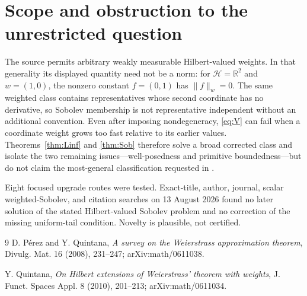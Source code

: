\documentclass[11pt]{article}
\newcommand{\Hh}{\mathcal H}
\begin{document}
\section{Scope and obstruction to the unrestricted question}

The source permits arbitrary weakly measurable Hilbert-valued weights.  In
that generality its displayed quantity need not be a norm: for
$\Hh=\mathbb R^2$ and $w=(1,0)$, the nonzero constant $f=(0,1)$ has
$\|f\|_w=0$.  The same weighted class contains representatives whose second
coordinate has no derivative, so Sobolev membership is not representative
independent without an additional convention.  Even after imposing
nondegeneracy, \eqref{eq:V} can fail when a coordinate weight grows too fast
relative to its earlier values.  Theorems~\ref{thm:Linf} and
\ref{thm:Sob} therefore solve a broad corrected class and isolate the two
remaining issues---well-posedness and primitive boundedness---but do not
claim the most-general classification requested in \cite{PQ}.

Eight focused upgrade routes were tested.  Exact-title, author, journal,
scalar weighted-Sobolev, and citation searches on 13 August 2026 found no
later solution of the stated Hilbert-valued Sobolev problem and no correction
of the missing uniform-tail condition.  Novelty is plausible, not certified.

\begin{thebibliography}{9}
D. Pérez and Y. Quintana,
\emph{A survey on the Weierstrass approximation theorem},
Divulg. Mat. 16 (2008), 231--247; arXiv:math/0611038.

Y. Quintana,
\emph{On Hilbert extensions of Weierstrass' theorem with weights},
J. Funct. Spaces Appl. 8 (2010), 201--213; arXiv:math/0611034.
\end{thebibliography}
\end{document}
